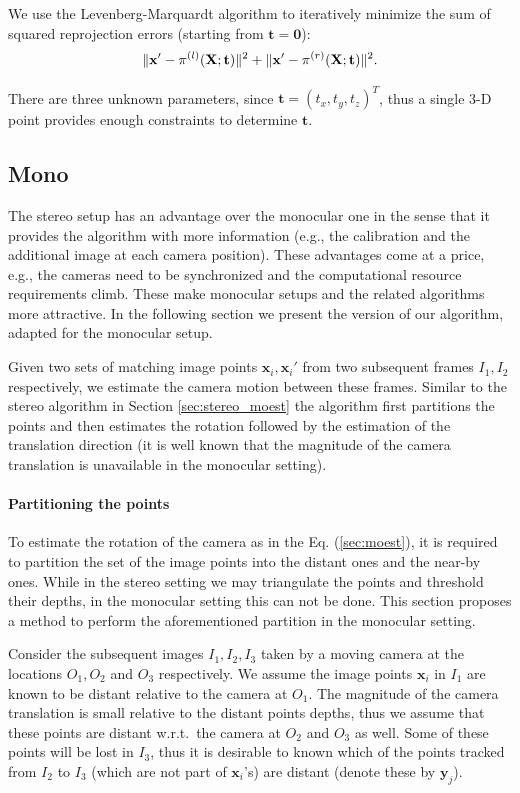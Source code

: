 \documentclass{bmvc2k}
\DeclarePairedDelimiter{\norm}{\lVert}{\rVert}
\begin{document}
We use the Levenberg-Marquardt algorithm to iteratively minimize the
sum of squared reprojection errors (starting from
$\mathbf{t}=\mathbf{0}$):
\begin{equation}
\norm{\mathbf{x'} - \pi^{(l)}(\mathbf{X};\mathbf{t})}^2 + \norm{\mathbf{x'} - \pi^{(r)}(\mathbf{X};\mathbf{t})}^2.
\end{equation}

There are three unknown parameters, since
$\mathbf{t} = (t_x,t_y,t_z)^T$, thus a single 3-D point provides
enough constraints to determine $\mathbf{t}$.

\subsection{Mono}\label{sec:mono_moest}

The stereo setup has an advantage over the monocular one in the sense
that it provides the algorithm with more information (e.g., the
calibration and the additional image at each camera position).  These
advantages come at a price, e.g., the cameras need to be synchronized
and the computational resource requirements climb.  These make
monocular setups and the related algorithms more attractive.  In the
following section we present the version of our algorithm, adapted for
the monocular setup.

Given two sets of matching image points $\mathbf{x}_i, \mathbf{x}_i'$
from two subsequent frames $I_1, I_2$ respectively, we estimate the
camera motion between these frames. Similar to the stereo algorithm in
Section \ref{sec:stereo_moest} the algorithm first partitions the
points and then estimates the rotation followed by the estimation of
the translation direction (it is well known that the magnitude of the
camera translation is unavailable in the monocular setting).

\paragraph{Partitioning the points} \label{sec:mono_split} To estimate
the rotation of the camera as in the Eq. (\ref{sec:moest}), it is
required to partition the set of the image points into the distant
ones and the near-by ones.  While in the stereo setting we may
triangulate the points and threshold their depths, in the monocular
setting this can not be done.  This section proposes a method to
perform the aforementioned partition in the monocular setting.

Consider the subsequent images $I_1, I_2, I_3$ taken by a moving
camera at the locations $O_1,O_2$ and $O_3$ respectively. We assume
the image points $\mathbf{x}_i$ in $I_1$ are known to be distant
relative to the camera at $O_1$.  The magnitude of the camera
translation is small relative to the distant points depths, thus we
assume that these points are distant w.r.t.\ the camera at $O_2$ and
$O_3$ as well.  Some of these points will be lost in $I_3$, thus it is
desirable to known which of the points tracked from $I_2$ to $I_3$
(which are not part of $\mathbf{x}_i$'s) are distant (denote these by
$\mathbf{y}_j$).
\end{document}
